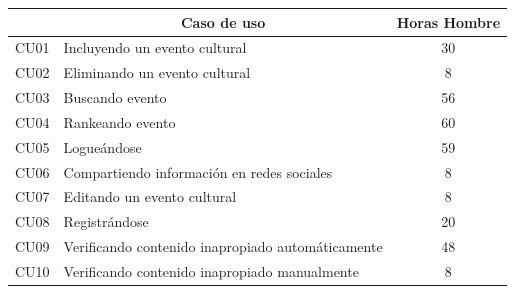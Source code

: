 \begin{table}[H]
\centering
\begin{tabular}{|l|l|c|}
\hline
\rowcolor[HTML]{CBCEFB} 
\multicolumn{1}{|c|}{\cellcolor[HTML]{CBCEFB}\textbf{Código}} & \multicolumn{1}{c|}{\cellcolor[HTML]{CBCEFB}\textbf{Caso de uso}} & \textbf{Horas Hombre} \\ \hline
CU01                                                          & Incluyendo un evento cultural                                     & 30                    \\ \hline
CU02                                                          & Eliminando un evento cultural                                     & 8                     \\ \hline
CU03                                                          & Buscando evento                                                   & 56                    \\ \hline
CU04                                                          & Rankeando evento                                                  & 60                    \\ \hline
CU05                                                          & Logueándose                                                       & 59                    \\ \hline
CU06                                                          & Compartiendo información en redes sociales                        & 8                     \\ \hline
CU07                                                          & Editando un evento cultural                                       & 8                     \\ \hline
CU08                                                          & Registrándose                                                     & 20                    \\ \hline
CU09                                                          & Verificando contenido inapropiado automáticamente                 & 48                    \\ \hline
CU10                                                          & Verificando contenido inapropiado manualmente                     & 8                     \\ \hline

\end{tabular}
\end{table}
